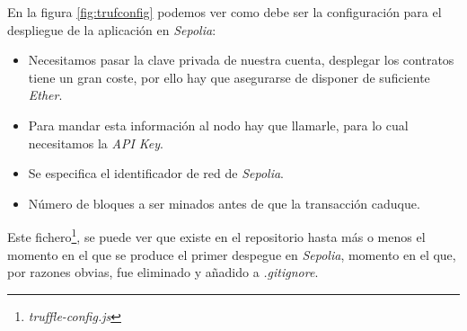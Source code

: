En la figura \ref{fig:trufconfig} podemos ver como debe ser la configuración para el despliegue de la aplicación en \textit{Sepolia}:
\begin{itemize}
    \item Necesitamos pasar la clave privada de nuestra cuenta, desplegar los contratos tiene un gran coste, por ello hay que asegurarse de disponer de suficiente  \textit{Ether}.
    \item Para mandar esta información al nodo hay que llamarle, para lo cual necesitamos la \textit{API Key}.
    \item Se especifica el identificador de red de \textit{Sepolia}.
    \item Número de bloques a ser minados antes de que la transacción caduque.
\end{itemize}

Este fichero\footnote{\textit{truffle-config.js}}, se puede ver que existe en el repositorio hasta más o menos el momento en el que se produce el primer despegue en \textit{Sepolia}, momento en el que, por razones obvias, fue eliminado y añadido a \textit{.gitignore}.
